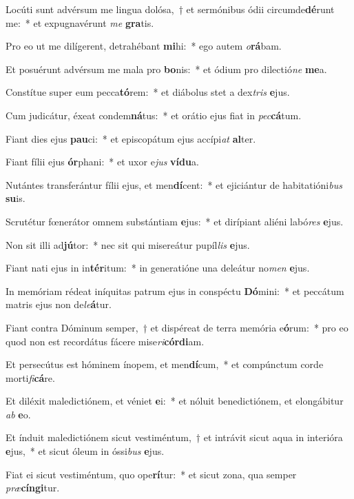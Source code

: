 \item Locúti sunt advérsum me lingua dolósa,~† et sermónibus ódii circumde\textbf{dé}runt me:~* et expugnavérunt \textit{me} \textbf{gra}tis.
\item Pro eo ut me dilígerent, detrahébant \textbf{mi}hi:~* ego autem \textit{o}\textbf{rá}bam.
\item Et posuérunt advérsum me mala pro \textbf{bo}nis:~* et ódium pro dilectió\textit{ne} \textbf{me}a.
\item Constítue super eum pecca\textbf{tó}rem:~* et diábolus stet a dex\textit{tris} \textbf{e}jus.
\item Cum judicátur, éxeat condem\textbf{ná}tus:~* et orátio ejus fiat in \textit{pec}\textbf{cá}tum.
\item Fiant dies ejus \textbf{pau}ci:~* et episcopátum ejus accípi\textit{at} \textbf{al}ter.
\item Fiant fílii ejus \textbf{ór}phani:~* et uxor e\textit{jus} \textbf{ví}\textbf{du}a.
\item Nutántes transferántur fílii ejus, et men\textbf{dí}cent:~* et ejiciántur de habitatióni\textit{bus} \textbf{su}is.
\item Scrutétur fœnerátor omnem substántiam \textbf{e}jus:~* et dirípiant aliéni labó\textit{res} \textbf{e}jus.
\item Non sit illi ad\textbf{jú}tor:~* nec sit qui misereátur pupíl\textit{lis} \textbf{e}jus.
\item Fiant nati ejus in in\textbf{tér}itum:~* in generatióne una deleátur no\textit{men} \textbf{e}jus.
\item In memóriam rédeat iníquitas patrum ejus in conspéctu \textbf{Dó}mini:~* et peccátum matris ejus non de\textit{le}\textbf{á}tur.
\item Fiant contra Dóminum semper,~† et dispéreat de terra memória e\textbf{ó}rum:~* pro eo quod non est recordátus fácere mise\textit{ri}\textbf{cór}\textbf{di}am.
\item Et persecútus est hóminem ínopem, et men\textbf{dí}cum,~* et compúnctum corde morti\textit{fi}\textbf{cá}re.
\item Et diléxit maledictiónem, et véniet \textbf{e}i:~* et nóluit benedictiónem, et elongábitur \textit{ab} \textbf{e}o.
\item Et índuit maledictiónem sicut vestiméntum,~† et intrávit sicut aqua in interióra \textbf{e}jus,~* et sicut óleum in óssi\textit{bus} \textbf{e}jus.
\item Fiat ei sicut vestiméntum, quo ope\textbf{rí}tur:~* et sicut zona, qua semper \textit{præ}\textbf{cín}\textbf{gi}tur.
